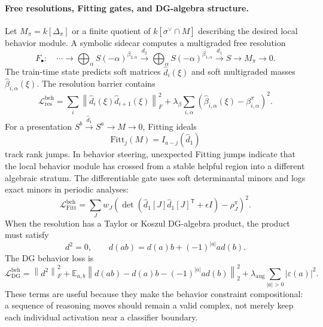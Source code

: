 \documentclass[11pt]{article}
\theoremstyle{definition}
\theoremstyle{plain}
\theoremstyle{remark}
\numberwithin{equation}{section}
\newcommand{\Eop}{\mathbb{E}}
\newcommand{\norm}[1]{\left\lVert #1\right\rVert}
\newcommand{\abs}[1]{\left\lvert #1\right\rvert}
\newcommand{\transpose}{^{\mathsf T}}
\begin{document}
\paragraph{Free resolutions, Fitting gates, and DG-algebra structure.}
Let $M_\pi=k[\Delta_\pi]$ or a finite quotient of $k[\sigma^\vee\cap M]$ describing the desired local behavior module.  A symbolic sidecar computes a multigraded free resolution
\begin{equation}
  F_\bullet:\quad
  \cdots\to\bigoplus_\alpha S(-\alpha)^{\beta_{2,\alpha}}
  \xrightarrow{d_2}
  \bigoplus_\alpha S(-\alpha)^{\beta_{1,\alpha}}
  \xrightarrow{d_1}
  S\to M_\pi\to0 .
\end{equation}
The train-time state predicts soft matrices $\widehat d_i(\xi)$ and soft multigraded masses $\widehat\beta_{i,\alpha}(\xi)$.  The resolution barrier contains
\begin{equation}
  \mathcal L_{\mathrm{res}}^{\mathrm{beh}}
  =
  \sum_i\norm{\widehat d_i(\xi)\widehat d_{i+1}(\xi)}_F^2
  +\lambda_\beta\sum_{i,\alpha}
  \left(\widehat\beta_{i,\alpha}(\xi)-\beta_{i,\alpha}^{\pi}\right)^2 .
\end{equation}
For a presentation $S^{b}\xrightarrow{\widehat d_1}S^a\to M\to0$, Fitting ideals
\begin{equation}
  \mathrm{Fitt}_j(M)=I_{a-j}(\widehat d_1)
\end{equation}
track rank jumps.  In behavior steering, unexpected Fitting jumps indicate that the local behavior module has crossed from a stable helpful region into a different algebraic stratum.  The differentiable gate uses soft determinantal minors and logs exact minors in periodic analyses:
\begin{equation}
  \mathcal L_{\mathrm{Fitt}}^{\mathrm{beh}}
  =
  \sum_{J}
  w_J\left(\det(\widehat d_1[J]\widehat d_1[J]\transpose+\epsilon I)-
  \rho_J^\pi\right)^2 .
\end{equation}
When the resolution has a Taylor or Koszul DG-algebra product, the product must satisfy
\begin{equation}
  d^2=0,\qquad
  d(ab)=d(a)b+(-1)^{|a|}ad(b).
\end{equation}
The DG behavior loss is
\begin{equation}
  \mathcal L_{\mathrm{DG}}^{\mathrm{beh}}
  =
  \norm{d^2}_F^2+
  \Eop_{a,b}\norm{d(ab)-d(a)b-(-1)^{|a|}ad(b)}_2^2+
  \lambda_{\mathrm{aug}}\sum_{|a|>0}\abs{\varepsilon(a)}^2 .
\end{equation}
These terms are useful because they make the behavior constraint compositional: a sequence of reasoning moves should remain a valid complex, not merely keep each individual activation near a classifier boundary.
\end{document}

